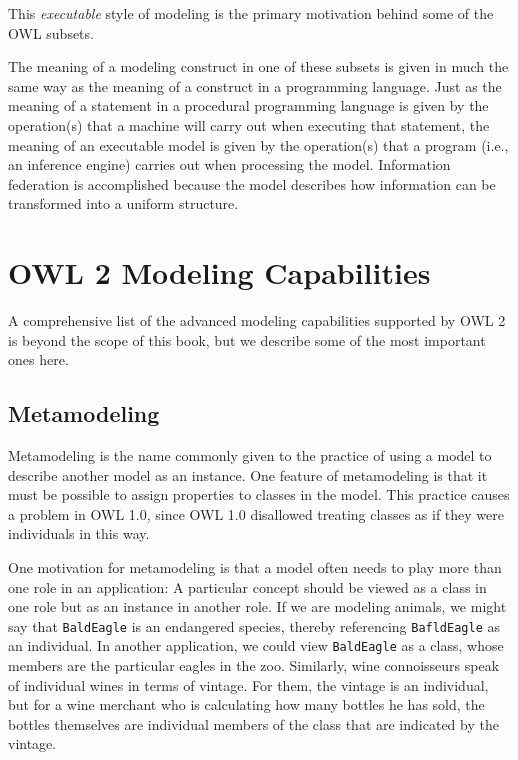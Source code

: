 This \emph{executable} style of modeling is the primary motivation behind some
of the OWL subsets.

The meaning of a modeling construct in one of these subsets is given in
much the same way as the meaning of a construct in a programming
language. Just as the meaning of a statement in a procedural programming
language is given by the operation(s) that a machine will carry out when
executing that statement, the meaning of an executable model is given by
the operation(s) that a program (i.e., an inference engine) carries out
when processing the model. Information federation is accomplished
because the model describes how information can be transformed into a
uniform structure.

\section{OWL 2 Modeling Capabilities}

A comprehensive list of the advanced modeling capabilities supported by
OWL 2 is beyond the scope of this book, but we describe some of the most
important ones here.

\subsection{Metamodeling}

Metamodeling is the name commonly given to the practice of using a model
to describe another model as an instance. One feature of metamodeling is
that it must be possible to assign properties to classes in the model.
This practice causes a problem in OWL 1.0, since OWL 1.0 disallowed
treating classes as if they were individuals in this way.

One motivation for metamodeling is that a model often needs to play more
than one role in an application: A particular concept should be viewed
as a class in one role but as an instance in another role. If we are
modeling animals, we might say that \texttt{BaldEagle} is an endangered species,
thereby referencing \texttt{BafldEagle} as an individual. In another application,
we could view \texttt{BaldEagle} as a class, whose members are the particular
eagles in the zoo. Similarly, wine connoisseurs speak of individual
wines in terms of vintage. For them, the vintage is an individual, but
for a wine merchant who is calculating how many bottles he has sold, the
bottles themselves are individual members of the class that are
indicated by the vintage.

